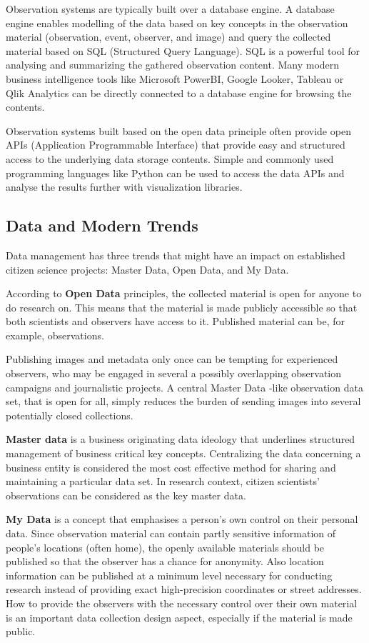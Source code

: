 \documentclass{article}
\begin{document}
Observation systems are typically built over a database engine. A database engine enables modelling of the data based on key concepts in the observation material (observation, event, observer, and image) and query the collected material based on SQL (Structured Query Language). SQL is a powerful tool for analysing and summarizing the gathered observation content. Many modern business intelligence tools like Microsoft PowerBI, Google Looker, Tableau or Qlik Analytics can be directly connected to a database engine for browsing the contents. 

Observation systems built based on the open data principle often provide open APIs (Application Programmable Interface) that provide easy and structured access to the underlying data storage contents. Simple and commonly used programming languages like Python can be used to access the data APIs and analyse the results further with visualization libraries.   

\subsection{Data and Modern Trends}\label{sec:data_trend}

Data management has three trends that might have an impact on established citizen science projects: Master Data, Open Data, and My Data.

According to \textbf{Open Data} principles, the collected material is open for anyone to do research on. This means that the material is made publicly accessible so that both scientists and observers have access to it. Published material can be, for example, observations. 

Publishing images and metadata only once can be tempting for experienced observers, who may be engaged in several a possibly overlapping observation campaigns and journalistic projects. A central Master Data -like observation data set, that is open for all, simply reduces the burden of sending images into several potentially closed collections. 

\textbf{Master data} is a business originating data ideology that underlines structured management of business critical key concepts. Centralizing the data concerning a business entity is considered the most cost effective method for sharing and maintaining a particular data set. In research context, citizen scientists' observations can be considered as the key master data.

\textbf{My Data} is a concept that emphasises a person's own control on their personal data. Since observation material can contain partly sensitive information of people's locations (often home), the openly available materials should be published so that the observer has a chance for anonymity. Also location information can be published at a minimum level necessary for conducting research instead of providing exact high-precision coordinates or street addresses. How to provide the observers with the necessary control over their own material is an important data collection design aspect, especially if the material is made public.
\end{document}
